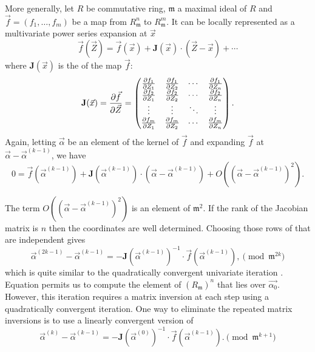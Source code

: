 More generally, let $R$ be commutative ring, $\mathfrak{m}$ a maximal
ideal of $R$ and $\vec{f} = (f_1,\ldots,f_m)$ be a map from $R_\mathfrak{
m}^n$ to $R_\mathfrak{m}^m$.  It can be locally represented as a
multivariate power series expansion at $\vec{x}$
\[
\vec{f} (\vec{Z}) = \vec{f}(\vec{x}) 
  + \mathbf{J}(\vec{x})\cdot(\vec{Z} - \vec{x}) 
  + \cdots
\]
where $\mathbf{J}(\vec{x})$ is the  of the map $\vec{f}$:
\[
\mathbf{J}(\vec{x}) = 
\frac{\partial \vec{f}}{\partial \vec{Z}}
=
\begin{pmatrix}{\partial f_1\over \partial Z_1}& {\partial f_1\over \partial Z_2}&
 \cdots&{\partial f_1\over \partial Z_n}\\
{\partial f_2\over \partial Z_1}& {\partial f_2\over \partial Z_2}&
 \cdots&{\partial f_2\over \partial Z_n}\\
\vdots&\vdots&\ddots&\vdots\\
{\partial f_m\over \partial Z_1}& {\partial f_m\over \partial Z_2}&
 \cdots&{\partial f_m\over \partial Z_n}\end{pmatrix}.
\]
Again, letting $\vec{\alpha}$ be an element of the kernel of $\vec{f}$ and
expanding $\vec{f}$ at $\vec{\alpha} - \vec{\alpha}^{(k-1)}$, we have
\begin{equation}
0 = \vec{f}(\vec{\alpha}^{(k-1)}) + \mathbf{J}(\vec{\alpha}^{(k-1)}) 
\cdot (\vec{\alpha}  - \vec{\alpha}^{(k-1)}) +
O\left((\vec{\alpha} - \vec{\alpha}^{(k-1)})^{2}\right).
\label{MNewton:1:Eq}
\end{equation}

The term $O\left((\vec{\alpha} - \vec{\alpha}^{(k-1)})^{2}\right)$ is an
element of $\mathfrak{m}^{2}$.  If the rank of the Jacobian matrix is $n$
then the coordinates are well determined.  Choosing those rows of
 that are independent gives
\begin{equation}\label{MNewton:2:Eq}
\vec{\alpha}^{(2k-1)} - \vec{\alpha}^{(k-1)} 
  = -\mathbf{J}(\vec{\alpha}^{(k-1)})^{-1} 
  \cdot \vec{f}(\vec{\alpha}^{(k-1)}), \pmod{\mathfrak{m}^{2k}}
\end{equation}
which is quite similar to the quadratically convergent univariate iteration
.  Equation  permits us to 
compute the element of 
$(R_\mathfrak{m})^n$ that lies over $\vec{\alpha_0}$.  However, this iteration
requires a matrix inversion at each step using a quadratically convergent 
iteration.  One way to eliminate the repeated matrix inversions is to use 
a linearly convergent version of 
\begin{equation}\label{MNewton:Lin:Eq}
\vec{\alpha}^{(k)} - \vec{\alpha}^{(k-1)}
   = -\mathbf{J}(\vec{\alpha}^{(0)})^{-1} 
  \cdot \vec{f}(\vec{\alpha}^{(k-1)}). \pmod{\mathfrak{m}^{k+1}}
\end{equation}

